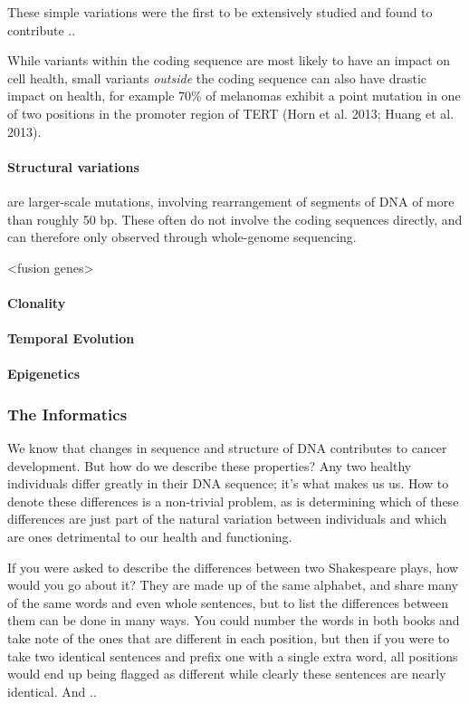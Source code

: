 These simple variations were the first to be extensively studied and found to contribute ..

While variants within the coding sequence are most likely to have an impact on cell health, small variants \emph{outside} the coding sequence can also have drastic impact on health, for example 70\% of melanomas exhibit a point mutation in one of two positions in the promoter region of TERT (Horn et al. 2013; Huang et al. 2013).

\paragraph{Structural variations} are larger-scale mutations, involving rearrangement of segments of DNA of more than roughly 50 bp. These often do not involve the coding sequences directly, and can therefore only observed through whole-genome sequencing.

<fusion genes>


\paragraph{Clonality}
\paragraph{Temporal Evolution}
\paragraph{Epigenetics}

\subsubsection{The Informatics}

We know that changes in sequence and structure of DNA contributes to cancer development. But how do we describe these properties? Any two healthy individuals differ greatly in their DNA sequence; it's what makes us us. How to denote these differences is a non-trivial problem, as is determining which of these differences are just part of the natural variation between individuals and which are ones detrimental to our health and functioning.

If you were asked to describe the differences between two Shakespeare plays, how would you go about it? They are made up of the same alphabet, and share many of the same words and even whole sentences, but to list the differences between them can be done in many ways. You could number the words in both books and take note of the ones that are different in each position, but then if you were to take two identical sentences and prefix one with a single extra word, all positions would end up being flagged as different while clearly these sentences are nearly identical. And ..

